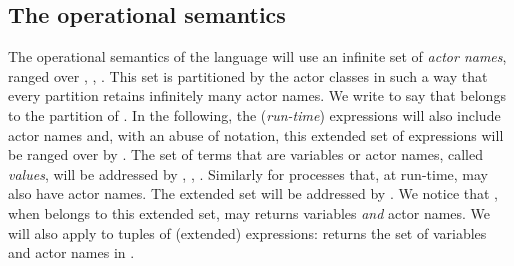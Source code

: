 \documentclass{LMCS}
\theoremstyle{plain}\newtheorem{proposition}[thm]{Proposition}
\theoremstyle{plain}\newtheorem{lemma}[thm]{Lemma}
\theoremstyle{plain}\newtheorem{theorem}[thm]{Theorem}
\theoremstyle{plain}\newtheorem{corollary}[thm]{Corollary}
\newif\iftype \typefalse
\newif\ifconf \conffalse
\newcommand{\actor}{}
\begin{document}
\fi

\iftype
For simplicity in presentation, usually the method definitions and fields associated to an actor are collected together and referred to as the actor definition.
A program is then a collection of actor definitions.
We may use the syntax exemplified in Fig. \ref{fig:actor_def} to give the definition of an actor (on top of the syntax defined above for method definitions).
This figure defines an actor , with fields  and , and methods  and .
Method  takes two variables  and  as its formal parameters, while  has no parameters.\footnote{Assuming bounded or unbounded variables has not effect on the decidability results.}.\sidenote{Does having unbounded variables affect the decidable results?} 
 and  represent the definitions of the methods.

\begin{figure}
\begin{lstlisting}[frame=single]
actor  {
	fields { ,  }
	method (, ) = 
	method () = 
}
\end{lstlisting}
\caption{An actor defined as the set of its fields and method definitions.}\label{fig:actor_def}
\end{figure}
\else

\fi

\ifconf
\paragraph{The operational semantics.}
\else
\subsection{The operational semantics}
\fi
The operational semantics of the language {\actor} will use an infinite set of 
\emph{actor names}, ranged over , , . This set
is partitioned by the actor classes in such a way that every partition retains 
infinitely many actor names. We write  to say that  
belongs to the partition of .
In the following, the (\emph{run-time}) expressions 
will also include actor names and, with an abuse of notation, this extended
set of expressions
will be ranged over by . The set of terms that are variables or 
actor names, called \emph{values}, will be addressed by , , .
Similarly for processes that, at run-time, may also have actor names. The extended
set will be addressed by . We notice that , when  belongs to this
extended set, may returns variables \emph{and} actor names. We will also apply
 to tuples of (extended) expressions:  returns
the set of variables and actor names in  .
\end{document}

